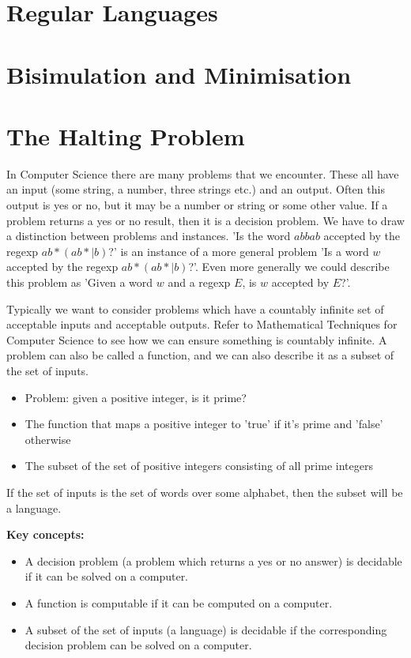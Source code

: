 \documentclass[11pt]{article}
\begin{document}
	\section{Regular Languages}
	
	\section{Bisimulation and Minimisation}
		
	\section{The Halting Problem}
	In Computer Science there are many problems that we encounter. These all have an input (some string, a number, three strings etc.) and an output. Often this output is yes or no, but it may be a number or string or some other value. If a problem returns a yes or no result, then it is a decision problem. We have to draw a distinction between problems and instances. 'Is the word $abbab$ accepted by the regexp $ab*(ab*|b)$?' is an instance of a more general problem 'Is a word $w$ accepted by the regexp $ab*(ab*|b)$?'. Even more generally we could describe this problem as 'Given a word $w$ and a regexp $E$, is $w$ accepted by $E$?'.
	
	\par 
	Typically we want to consider problems which have a countably infinite set of acceptable inputs and acceptable outputs. Refer to Mathematical Techniques for Computer Science to see how we can ensure something is countably infinite. A problem can also be called a function, and we can also describe it as a subset of the set of inputs. 
	\begin{itemize}
		\item Problem: given a positive integer, is it prime?
		\item The function that maps a positive integer to 'true' if it's prime and 'false' otherwise
		\item The subset of the set of positive integers consisting of all prime integers
	\end{itemize}
	If the set of inputs is the set of words over some alphabet, then the subset will be a language.
	
	\par
	\textbf{Key concepts:}
	\begin{itemize}
		\item A decision problem (a problem which returns a yes or no answer) is decidable if it can be solved on a computer.
		\item A function is computable if it can be computed on a computer.
		\item A subset of the set of inputs (a language) is decidable if the corresponding decision problem can be solved on a computer.
	\end{itemize}
	
\end{document}
